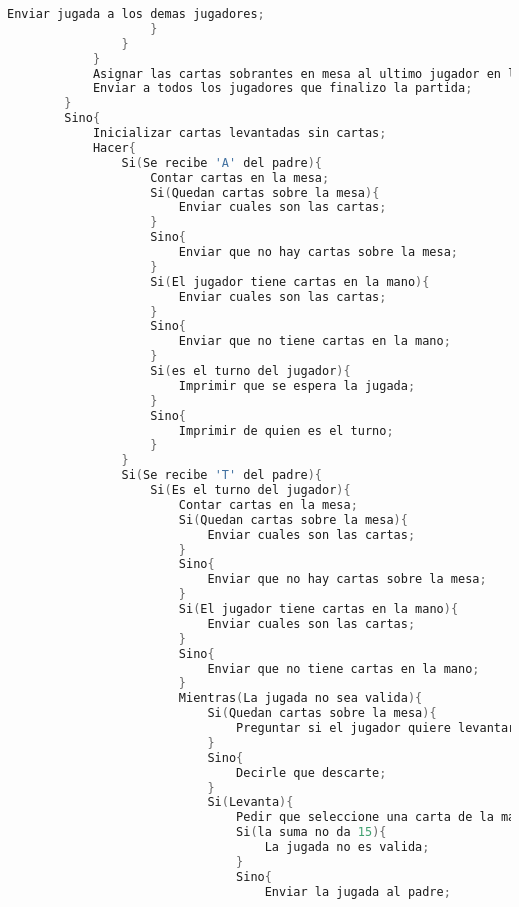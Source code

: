 \begin{lstlisting}[language=C]
                        Enviar jugada a los demas jugadores;
                    }
                }
            }
            Asignar las cartas sobrantes en mesa al ultimo jugador en levantar;
            Enviar a todos los jugadores que finalizo la partida;
        }
        Sino{
            Inicializar cartas levantadas sin cartas;
            Hacer{
                Si(Se recibe 'A' del padre){
                    Contar cartas en la mesa;
                    Si(Quedan cartas sobre la mesa){
                        Enviar cuales son las cartas;
                    }
                    Sino{
                        Enviar que no hay cartas sobre la mesa;
                    }
                    Si(El jugador tiene cartas en la mano){
                        Enviar cuales son las cartas;
                    }
                    Sino{
                        Enviar que no tiene cartas en la mano;
                    }
                    Si(es el turno del jugador){
                        Imprimir que se espera la jugada;
                    }
                    Sino{
                        Imprimir de quien es el turno;
                    }
                }
                Si(Se recibe 'T' del padre){
                    Si(Es el turno del jugador){
                        Contar cartas en la mesa;
                        Si(Quedan cartas sobre la mesa){
                            Enviar cuales son las cartas;
                        }
                        Sino{
                            Enviar que no hay cartas sobre la mesa;
                        }
                        Si(El jugador tiene cartas en la mano){
                            Enviar cuales son las cartas;
                        }
                        Sino{
                            Enviar que no tiene cartas en la mano;
                        }
                        Mientras(La jugada no sea valida){
                            Si(Quedan cartas sobre la mesa){
                                Preguntar si el jugador quiere levantar o descartar;
                            }
                            Sino{
                                Decirle que descarte;
                            }
                            Si(Levanta){
                                Pedir que seleccione una carta de la mano y las correspondientes de la mesa;
                                Si(la suma no da 15){
                                    La jugada no es valida;
                                }
                                Sino{
                                    Enviar la jugada al padre;

\end{lstlisting}
